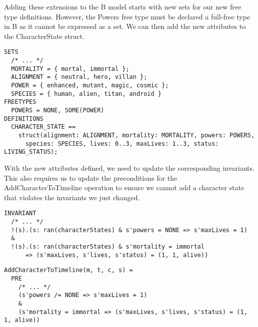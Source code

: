 \documentclass{article}
\begin{document}
\hspace{-0.64cm} Adding these extensions to the B model starts with new sets for our new free type definitions. However, the Powers free type must be declared a full-free type in B as it cannot be expressed as a set. We can then add the new attributes to the CharacterState struct.

\begin{verbatim}
SETS 
  /* ... */
  MORTALITY = { mortal, immortal };
  ALIGNMENT = { neutral, hero, villan };
  POWER = { enhanced, mutant, magic, cosmic };
  SPECIES = { human, alien, titan, android }
FREETYPES
  POWERS = NONE, SOME(POWER)
DEFINITIONS
  CHARACTER_STATE == 
    struct(alignment: ALIGNMENT, mortality: MORTALITY, powers: POWERS, 
      species: SPECIES, lives: 0..3, maxLives: 1..3, status: LIVING_STATUS);
\end{verbatim}

\hspace{-0.64cm} With the new attributes defined, we need to update the corresponding invariants. This also requires us to update the preconditions for the AddCharacterToTimeline operation to ensure we cannot add a character state that violates the invariants we just changed.

\begin{verbatim}
INVARIANT
  /* ... */
  !(s).(s: ran(characterStates) & s'powers = NONE => s'maxLives = 1)
  &
  !(s).(s: ran(characterStates) & s'mortality = immortal 
      => (s'maxLives, s'lives, s'status) = (1, 1, alive))
\end{verbatim}

\begin{verbatim}
AddCharacterToTimeline(m, t, c, s) =
  PRE
    /* ... */
    (s'powers /= NONE => s'maxLives = 1)
    &
    (s'mortality = immortal => (s'maxLives, s'lives, s'status) = (1, 1, alive))
\end{verbatim}
\end{document}
